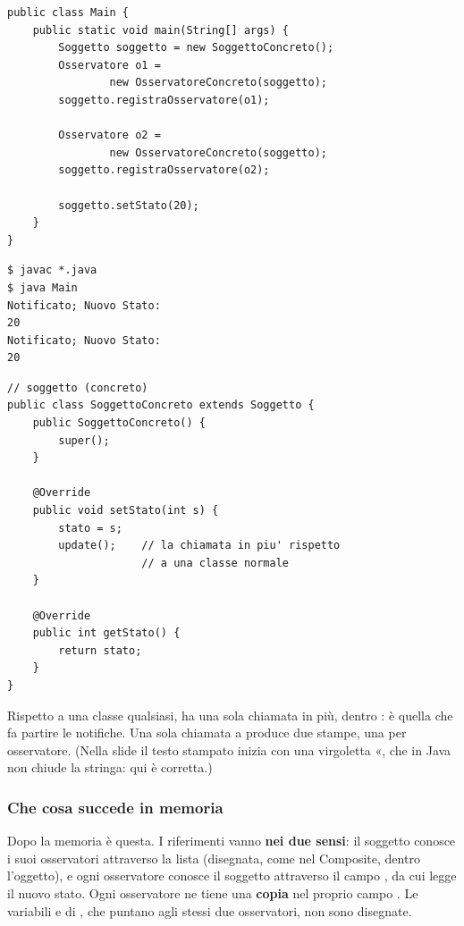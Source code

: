 \noindent\begin{minipage}[t]{0.49\textwidth}
\begin{lstlisting}[style=java, name=Main.java]
public class Main {
    public static void main(String[] args) {
        Soggetto soggetto = new SoggettoConcreto();
        Osservatore o1 =
                new OsservatoreConcreto(soggetto);
        soggetto.registraOsservatore(o1);

        Osservatore o2 =
                new OsservatoreConcreto(soggetto);
        soggetto.registraOsservatore(o2);

        soggetto.setStato(20);
    }
}
\end{lstlisting}
\begin{lstlisting}[style=shell, name=Terminale]
$ javac *.java
$ java Main
Notificato; Nuovo Stato:
20
Notificato; Nuovo Stato:
20
\end{lstlisting}
\end{minipage}\hfill
\begin{minipage}[t]{0.49\textwidth}
\begin{lstlisting}[style=java, name=SoggettoConcreto.java]
// soggetto (concreto)
public class SoggettoConcreto extends Soggetto {
    public SoggettoConcreto() {
        super();
    }

    @Override
    public void setStato(int s) {
        stato = s;
        update();    // la chiamata in piu' rispetto
                     // a una classe normale
    }

    @Override
    public int getStato() {
        return stato;
    }
}
\end{lstlisting}
\end{minipage}

\medskip
Rispetto a una classe qualsiasi,  ha una sola chiamata in più,  dentro
: è quella che fa partire le notifiche. Una sola chiamata a  produce due stampe, una per
osservatore. (Nella slide il testo stampato inizia con una virgoletta «, che in Java non chiude la stringa: qui è
corretta.)

\subsubsection*{Che cosa succede in memoria}

Dopo  la memoria è questa. I riferimenti vanno \textbf{nei due sensi}: il soggetto conosce i suoi
osservatori attraverso la lista (disegnata, come nel Composite, dentro l'oggetto), e ogni osservatore conosce il soggetto
attraverso il campo , da cui legge il nuovo stato. Ogni osservatore ne tiene una \textbf{copia} nel proprio
campo . Le variabili  e  di , che puntano agli stessi due osservatori, non sono
disegnate.

